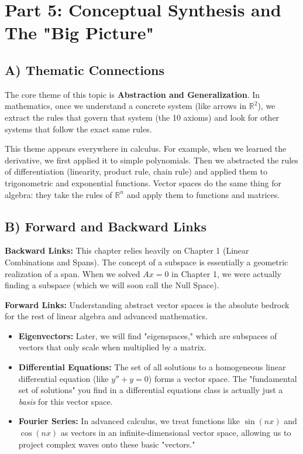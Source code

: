 \documentclass[12pt]{article}
\begin{document}
\newpage

\section{Part 5: Conceptual Synthesis and The "Big Picture"}

\subsection{A) Thematic Connections}
The core theme of this topic is \textbf{Abstraction and Generalization}. In mathematics, once we understand a concrete system (like arrows in $\mathbb{R}^2$), we extract the rules that govern that system (the 10 axioms) and look for other systems that follow the exact same rules. 

This theme appears everywhere in calculus. For example, when we learned the derivative, we first applied it to simple polynomials. Then we abstracted the rules of differentiation (linearity, product rule, chain rule) and applied them to trigonometric and exponential functions. Vector spaces do the same thing for algebra: they take the rules of $\mathbb{R}^n$ and apply them to functions and matrices.

\subsection{B) Forward and Backward Links}
\textbf{Backward Links:} This chapter relies heavily on Chapter 1 (Linear Combinations and Spans). The concept of a subspace is essentially a geometric realization of a span. When we solved $Ax = 0$ in Chapter 1, we were actually finding a subspace (which we will soon call the Null Space).

\textbf{Forward Links:} Understanding abstract vector spaces is the absolute bedrock for the rest of linear algebra and advanced mathematics. 
\begin{itemize}
    \item \textbf{Eigenvectors:} Later, we will find "eigenspaces," which are subspaces of vectors that only scale when multiplied by a matrix.
    \item \textbf{Differential Equations:} The set of all solutions to a homogeneous linear differential equation (like $y'' + y = 0$) forms a vector space. The "fundamental set of solutions" you find in a differential equations class is actually just a \textit{basis} for this vector space.
    \item \textbf{Fourier Series:} In advanced calculus, we treat functions like $\sin(nx)$ and $\cos(nx)$ as vectors in an infinite-dimensional vector space, allowing us to project complex waves onto these basic "vectors."
\end{itemize}
\end{document}

